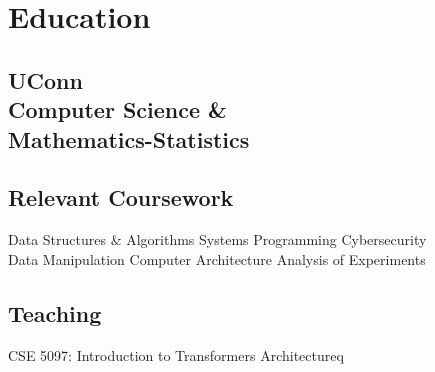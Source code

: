 \documentclass[]{resume-template}
\begin{document}
%
%
    \lastupdated{}

%
%

%
%

    \begin{minipage}[t]{0.33\textwidth}


        \section{Education}\label{sec:education}

        \subsection{UConn\\ Computer Science \&\\
        Mathematics-Statistics}\label{subsec:uconn}
        \vspace{\topsep}

        \subsection{Relevant Coursework}\label{subsec:coursework}
        Data Structures \& Algorithms \textbullet{} Systems Programming \textbullet{} Cybersecurity \textbullet{}\\ Data Manipulation \textbullet{}
        Computer Architecture \textbullet{} Analysis of Experiments
        \sectionsep{}

        \subsection{Teaching}\label{subsec:teaching}
        CSE 5097: Introduction to Transformers Architectureq




\end{minipage}
\end{document}
